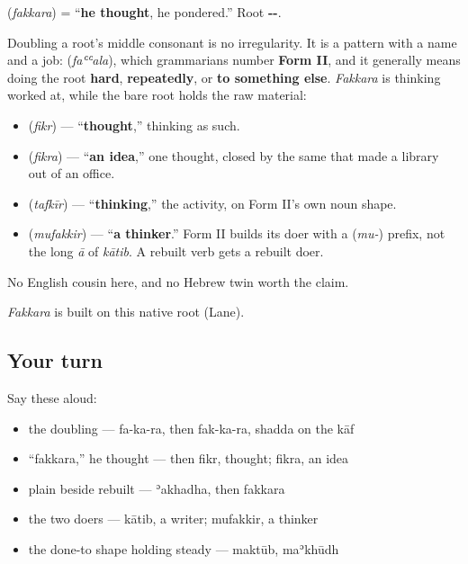 \begin{cousinweb}
\textbf{} (\emph{fakkara}) = \textquotedblleft{}\textbf{he thought}, he pondered.\textquotedblright{} Root \textbf{--}.

Doubling a root's middle consonant is no irregularity. It is a pattern with a name and a job: \textbf{} (\emph{faʿʿala}), which grammarians number \textbf{Form II}, and it generally means doing the root \textbf{hard}, \textbf{repeatedly}, or \textbf{to something else}. \emph{Fakkara} is thinking worked at, while the bare root holds the raw material:

\begin{itemize}
\raggedright
  \item \textbf{} (\emph{fikr}) — \textquotedblleft{}\textbf{thought},\textquotedblright{} thinking as such.
  \item \textbf{} (\emph{fikra}) — \textquotedblleft{}\textbf{an idea},\textquotedblright{} one thought, closed by the same \textbf{} that made a library out of an office.
  \item \textbf{} (\emph{tafkīr}) — \textquotedblleft{}\textbf{thinking},\textquotedblright{} the activity, on Form II's own noun shape.
  \item \textbf{} (\emph{mufakkir}) — \textquotedblleft{}\textbf{a thinker}.\textquotedblright{} Form II builds its doer with a \textbf{} (\emph{mu-}) prefix, not the long \emph{ā} of \emph{kātib}. A rebuilt verb gets a rebuilt doer.
\end{itemize}

No English cousin here, and no Hebrew twin worth the claim.

\emph{Fakkara} is built on this native root (Lane).
\end{cousinweb}

\subsection*{Your turn}
Say these aloud:

\begin{itemize}
\raggedright
  \item the doubling — fa-ka-ra, then fak-ka-ra, shadda on the kāf
  \item \textquotedblleft{}fakkara,\textquotedblright{} he thought — then fikr, thought; fikra, an idea
  \item plain beside rebuilt — ʾakhadha, then fakkara
  \item the two doers — kātib, a writer; mufakkir, a thinker
  \item the done-to shape holding steady — maktūb, maʾkhūdh
\end{itemize}

